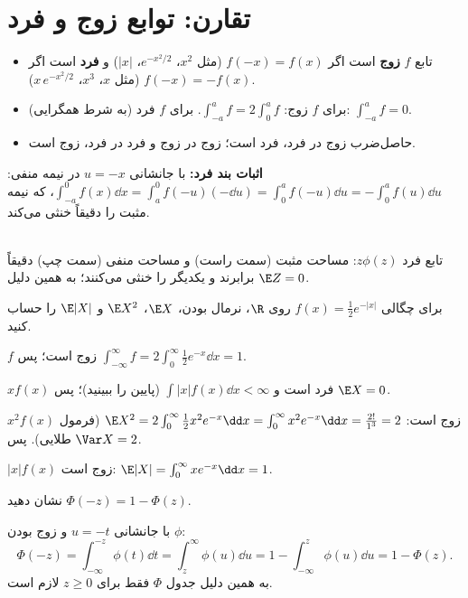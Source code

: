 \section{تقارن: توابع زوج و فرد}
\begin{itemize}
\item تابع $f$ \textbf{زوج} است اگر $f(-x)=f(x)$ (مثل $x^2$، $e^{-x^2/2}$، $|x|$) و \textbf{فرد} است اگر $f(-x)=-f(x)$ (مثل $x$، $x^3$، $x\,e^{-x^2/2}$).
\item برای $f$ زوج: $\int_{-a}^af=2\int_0^af$. برای $f$ فرد (به شرط همگرایی): $\int_{-a}^af=0$.
\item حاصل‌ضرب زوج در فرد، فرد است؛ زوج در زوج و فرد در فرد، زوج است.
\end{itemize}
\textbf{اثبات بند فرد:} با جانشانی $u=-x$ در نیمه منفی: $\int_{-a}^0f(x)\dd x=\int_a^0f(-u)(-\dd u)=\int_0^af(-u)\dd u=-\int_0^af(u)\dd u$، که نیمه مثبت را دقیقاً خنثی می‌کند.

\begin{center}
\begin{tikzpicture}
\end{tikzpicture}\\
{\small تابع فرد $z\phi(z)$: مساحت مثبت (سمت راست) و مساحت منفی (سمت چپ) دقیقاً برابرند و یکدیگر را خنثی می‌کنند؛ به همین دلیل $\E Z=0$.}
\end{center}

\begin{example}
برای چگالی $f(x)=\frac12e^{-|x|}$ روی $\R$، نرمال بودن، $\E X$، $\E X^2$ و $\E|X|$ را حساب کنید.
\begin{solution}
$f$ زوج است؛ پس $\int_{-\infty}^\infty f=2\int_0^\infty\frac12e^{-x}\dd x=1$.

$xf(x)$ فرد است و $\int|x|f(x)\dd x<\infty$ (پایین را ببینید)؛ پس $\E X=0$.

$x^2f(x)$ زوج است: $\E X^2=2\int_0^\infty\frac12x^2e^{-x}\dd x=\int_0^\infty x^2e^{-x}\dd x=\frac{2!}{1^3}=2$ (فرمول طلایی). پس $\Var X=2$.

$|x|f(x)$ زوج است: $\E|X|=\int_0^\infty xe^{-x}\dd x=1$.
\end{solution}
\end{example}

\begin{example}
نشان دهید $\Phi(-z)=1-\Phi(z)$.
\begin{solution}
با جانشانی $u=-t$ و زوج بودن $\phi$:
\[
\Phi(-z)=\int_{-\infty}^{-z}\phi(t)\dd t=\int_{z}^{\infty}\phi(u)\dd u=1-\int_{-\infty}^z\phi(u)\dd u=1-\Phi(z).
\]
به همین دلیل جدول $\Phi$ فقط برای $z\ge0$ لازم است.
\end{solution}
\end{example}

